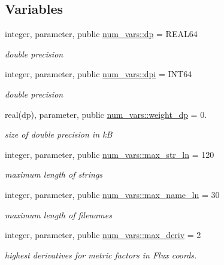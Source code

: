 \subsection*{Variables}
\begin{DoxyCompactItemize}
\item 
integer, parameter, public \hyperlink{namespacenum__vars_a03802aa2bd86439d7a9370836fabf3f2}{num\+\_\+vars\+::dp} = R\+E\+A\+L64
\begin{DoxyCompactList}\small\item\em double precision \end{DoxyCompactList}\item 
integer, parameter, public \hyperlink{namespacenum__vars_a7e4915cb055749f1170afaa77b055cd5}{num\+\_\+vars\+::dpi} = I\+N\+T64
\begin{DoxyCompactList}\small\item\em double precision \end{DoxyCompactList}\item 
real(dp), parameter, public \hyperlink{namespacenum__vars_ad5be06791ebf0ca75fc6dc7339916ae8}{num\+\_\+vars\+::weight\+\_\+dp} = 0.
\begin{DoxyCompactList}\small\item\em size of double precision in kB \end{DoxyCompactList}\item 
integer, parameter, public \hyperlink{namespacenum__vars_a3ff2bb983ee80a6735277d6789e6ce7c}{num\+\_\+vars\+::max\+\_\+str\+\_\+ln} = 120
\begin{DoxyCompactList}\small\item\em maximum length of strings \end{DoxyCompactList}\item 
integer, parameter, public \hyperlink{namespacenum__vars_a1b79c43315241705b429443dfe798837}{num\+\_\+vars\+::max\+\_\+name\+\_\+ln} = 30
\begin{DoxyCompactList}\small\item\em maximum length of filenames \end{DoxyCompactList}\item 
integer, parameter, public \hyperlink{namespacenum__vars_a78f5aeea9d9c2f41e388bfcef9021e64}{num\+\_\+vars\+::max\+\_\+deriv} = 2
\begin{DoxyCompactList}\small\item\em highest derivatives for metric factors in Flux coords. \end{DoxyCompactList}\item 

\end{DoxyCompactItemize}
